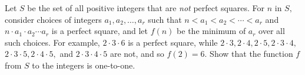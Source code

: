 Let $S$ be the set of all positive integers that are \textit{not} perfect squares. For $n$ in $S,$ consider choices of integers $a_1,a_2,\dots, a_r$ such that $n<a_1<a_2<\cdots<a_r$ and $n\cdot a_1\cdot a_2\cdots a_r$ is a perfect square, and let $f(n)$ be the minimum of $a_r$ over all such choices. For example, $2\cdot 3\cdot 6$ is a perfect square, while $2\cdot 3,2\cdot 4, 2\cdot 5, 2\cdot 3\cdot 4,$ $2\cdot 3\cdot 5, 2\cdot 4\cdot 5,$ and $2\cdot 3\cdot 4\cdot 5$ are not, and so $f(2)=6.$ Show that the function $f$ from $S$ to the integers is one-to-one.